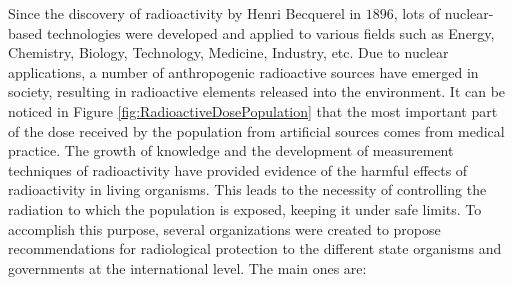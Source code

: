 Since the discovery of radioactivity by Henri Becquerel in $1896$, lots of nuclear-based technologies were developed and applied to various fields such as Energy, Chemistry, Biology, Technology, Medicine, Industry, etc. Due to nuclear applications, a number of anthropogenic radioactive sources have emerged in society, resulting in radioactive elements released into the environment. It can be noticed in Figure \ref{fig:RadioactiveDosePopulation} that the most important part of the dose received by the population from artificial sources comes from medical practice. The growth of knowledge and the development of measurement techniques of radioactivity have provided evidence of the harmful effects of radioactivity in living organisms. This leads to the necessity of controlling the radiation to which the population is exposed, keeping it under safe limits. To accomplish this purpose, several organizations were created to propose recommendations for radiological protection to the different state organisms and governments at the international level. The main ones are:

